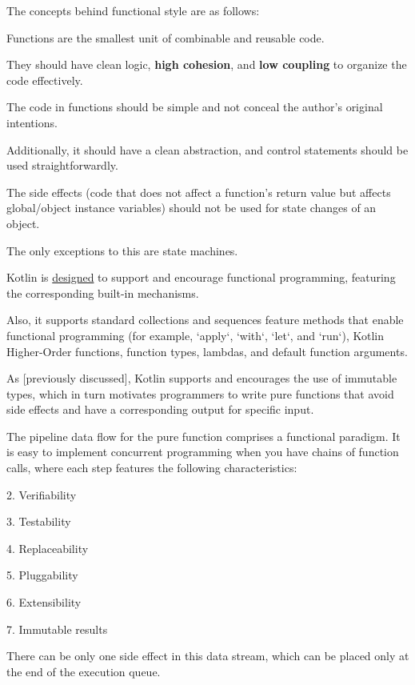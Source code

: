 {{{{The concepts behind functional style are as follows: 

Functions are the smallest unit of combinable and reusable code.

They should have clean logic, \textbf{high cohesion}, and \textbf{low coupling} to organize the code effectively.

The code in functions should be simple and not conceal the author's original intentions.



Additionally, it should have a clean abstraction, and control statements should be used straightforwardly.

The side effects (code that does not affect a function's return value but affects global/object instance variables) should not be used for state changes of an object.

The only exceptions to this are state machines.



Kotlin is \href{https://www.slideshare.net/abreslav/whos-more-functional-kotlin-groovy-scala-or-java}{designed} to support and encourage functional programming, featuring the corresponding built-in mechanisms.

Also, it supports standard collections and sequences feature methods that enable functional programming (for example, `apply`, `with`, `let`, and `run`), Kotlin Higher-Order functions, function types, lambdas, and default function arguments.

As [previously discussed], Kotlin supports and encourages the use of immutable types, which in turn motivates programmers to write pure functions that avoid side effects and have a corresponding output for specific input. 

The pipeline data flow for the pure function comprises a functional paradigm. It is easy to implement concurrent programming when you have chains of function calls, where each step features the following characteristics:


2.	Verifiability

3.	Testability

4.	Replaceability

5.	Pluggability

6.	Extensibility

7.	Immutable results



There can be only one side effect in this data stream, which can be placed only at the end of the execution queue.



}}}}
